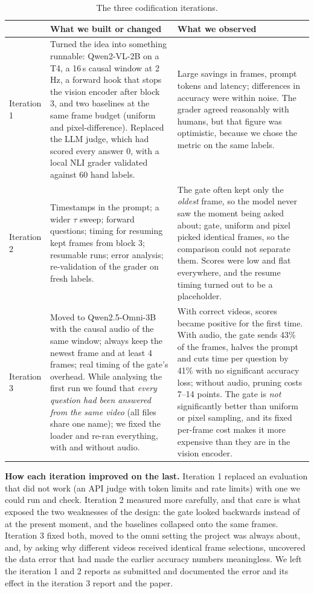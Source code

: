\documentclass[11pt]{article}
\begin{document}
\begin{table}[h]
\centering
\small
\renewcommand{\arraystretch}{1.15}
\begin{tabularx}{\textwidth}{@{}p{1.6cm}XX@{}}
\toprule
 & What we built or changed & What we observed \\
\midrule
Iteration 1 &
Turned the idea into something runnable: Qwen2-VL-2B on a T4, a 16\,s causal window at 2\,Hz, a forward hook that stops the vision encoder after block 3, and two baselines at the same frame budget (uniform and pixel-difference). Replaced the LLM judge, which had scored every answer 0, with a local NLI grader validated against 60 hand labels. &
Large savings in frames, prompt tokens and latency; differences in accuracy were within noise. The grader agreed reasonably with humans, but that figure was optimistic, because we chose the metric on the same labels. \\
\midrule
Iteration 2 &
Timestamps in the prompt; a wider $\tau$ sweep; forward questions; timing for resuming kept frames from block 3; resumable runs; error analysis; re-validation of the grader on fresh labels. &
The gate often kept only the \emph{oldest} frame, so the model never saw the moment being asked about; gate, uniform and pixel picked identical frames, so the comparison could not separate them. Scores were low and flat everywhere, and the resume timing turned out to be a placeholder. \\
\midrule
Iteration 3 &
Moved to Qwen2.5-Omni-3B with the causal audio of the same window; always keep the newest frame and at least 4 frames; real timing of the gate's overhead. While analysing the first run we found that \emph{every question had been answered from the same video} (all files share one name); we fixed the loader and re-ran everything, with and without audio. &
With correct videos, scores became positive for the first time. With audio, the gate sends 43\% of the frames, halves the prompt and cuts time per question by 41\% with no significant accuracy loss; without audio, pruning costs 7--14 points. The gate is \emph{not} significantly better than uniform or pixel sampling, and its fixed per-frame cost makes it more expensive than they are in the vision encoder. \\
\bottomrule
\end{tabularx}
\caption{The three codification iterations.}
\label{tab:iters}
\end{table}

\textbf{How each iteration improved on the last.} Iteration 1 replaced an evaluation that did not work (an API judge with token limits and rate limits) with one we could run and check. Iteration 2 measured more carefully, and that care is what exposed the two weaknesses of the design: the gate looked backwards instead of at the present moment, and the baselines collapsed onto the same frames. Iteration 3 fixed both, moved to the omni setting the project was always about, and, by asking why different videos received identical frame selections, uncovered the data error that had made the earlier accuracy numbers meaningless. We left the iteration 1 and 2 reports as submitted and documented the error and its effect in the iteration 3 report and the paper.
\end{document}
